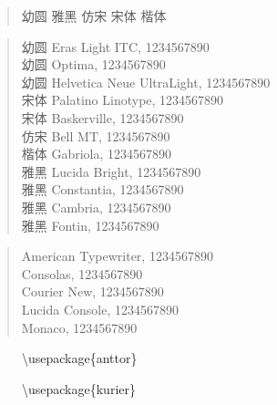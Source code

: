 \documentclass[12pt,a4paper]{article}
\begin{document}
\begin{verse}
{\YouYuan 幼圆}
{\YaHei 雅黑}
{\FangSong 仿宋}
{\SimSun 宋体}
{\KaiTi 楷体}
\end{verse}


\begin{verse}
{\YouYuan 幼圆} {\Eras Eras Light ITC, 1234567890}\\
{\YouYuan 幼圆} {\Optima Optima, 1234567890}\\
{\YouYuan 幼圆} {\HelveticaNeueUL Helvetica Neue UltraLight, 1234567890}\\
{\SimSun 宋体} {\Palatino Palatino Linotype, 1234567890}\\
{\SimSun 宋体} {\Baskerville Baskerville, 1234567890}\\
{\FangSong 仿宋} {\BellMT Bell MT, 1234567890}\\
{\KaiTi 楷体} {\Gabriola Gabriola, 1234567890}\\
{\YaHei 雅黑} {\LucidaBright Lucida Bright, 1234567890}\\
{\YaHei 雅黑} {\Constantia Constantia, 1234567890}\\
{\YaHei 雅黑} {\Cambria Cambria, 1234567890}\\
{\YaHei 雅黑} {\Fontin Fontin, 1234567890}\\
\end{verse}

\begin{verse}
{\Typewriter American Typewriter, 1234567890}\\
{\Consolas Consolas, 1234567890}\\
{\CourierNew Courier New, 1234567890}\\
{\LucidaConsole Lucida Console, 1234567890}\\
{\Monaco Monaco, 1234567890}\\
\end{verse}

\begin{center}
\begin{figure*}[h]
\caption{\textbackslash{}usepackage\{anttor\}}
\vspace{4pt}
\setlength\fboxsep{0pt}
\setlength\fboxrule{0.5pt}
\end{figure*}

\begin{figure*}[h]
\caption{\textbackslash{}usepackage\{kurier\}}
\vspace{4pt}
\setlength\fboxsep{0pt}
\setlength\fboxrule{0.5pt}
\end{figure*}
\end{center}
\end{document}
